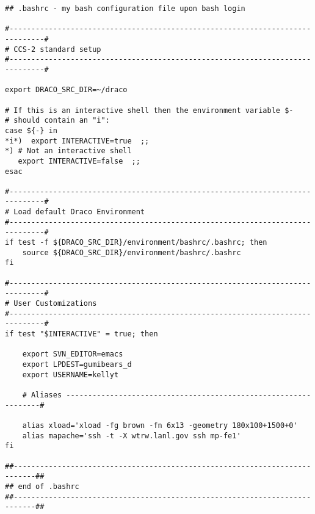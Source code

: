 \begin{verbatim}
## .bashrc - my bash configuration file upon bash login

#------------------------------------------------------------------------------#
# CCS-2 standard setup
#------------------------------------------------------------------------------#

export DRACO_SRC_DIR=~/draco

# If this is an interactive shell then the environment variable $-
# should contain an "i":
case ${-} in 
*i*)  export INTERACTIVE=true  ;;
*) # Not an interactive shell
   export INTERACTIVE=false  ;;
esac

#------------------------------------------------------------------------------#
# Load default Draco Environment
#------------------------------------------------------------------------------#
if test -f ${DRACO_SRC_DIR}/environment/bashrc/.bashrc; then
    source ${DRACO_SRC_DIR}/environment/bashrc/.bashrc
fi

#------------------------------------------------------------------------------#
# User Customizations
#------------------------------------------------------------------------------#
if test "$INTERACTIVE" = true; then

    export SVN_EDITOR=emacs
    export LPDEST=gumibears_d
    export USERNAME=kellyt

    # Aliases ----------------------------------------------------------------#

    alias xload='xload -fg brown -fn 6x13 -geometry 180x100+1500+0'
    alias mapache='ssh -t -X wtrw.lanl.gov ssh mp-fe1'
fi

##---------------------------------------------------------------------------##
## end of .bashrc
##---------------------------------------------------------------------------##
\end{verbatim}
